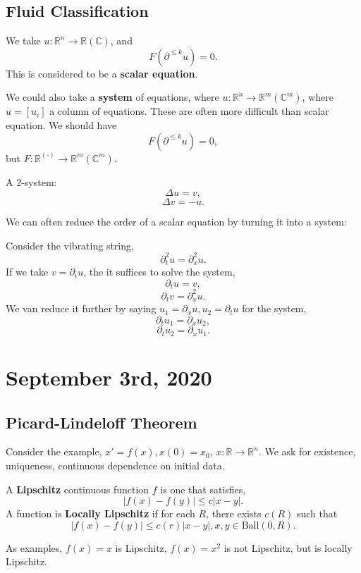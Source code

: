 \documentclass[12pt]{scrartcl}
\newcommand{\R}{\mathbb{R}}
\newcommand{\C}{\mathbb C}
\begin{document}
\subsection{Fluid Classification}
We take $u : \R^n \rightarrow \R(\C)$, and 
$$F(\partial^{\le k} u) =  0.$$
This is considered to be a \textbf{scalar equation}.

We could also take a \textbf{system} of equations, where $u: \R^n \rightarrow \R^m(\C^m)$, where $u = [u_i]$ a column of equations.  These are often more difficult than scalar equation.  We should have 
$$F(\partial^{\le k} u) = 0,$$
but $F : \R^{(\cdot)} \rightarrow \R^m(\C^m).$
\begin{example} A 2-system:
$$\Delta u = v,$$
$$\Delta v = -u.$$
\end{example}
We can often reduce the order of a scalar equation by turning it into a system:
\begin{example} Consider the vibrating string, $$\partial_t^2 u = \partial_x^2 u.$$
If we take $v = \partial_t u$, the it suffices to solve the system,
$$\partial_t u = v,$$
$$\partial_t v = \partial_x^2 u.$$
We van reduce it further by saying $u_1 = \partial_x u, u_2 = \partial_t u$ for the system,
$$\partial_t u_1 = \partial_x u_2,$$
$$\partial_t u_2 = \partial_x u_1.$$
\end{example}
\newpage
\section{September 3rd, 2020}
\subsection{Picard-Lindeloff Theorem}
Consider the example, $x' = f(x), x(0) = x_0$, $x: \R \rightarrow \R^n$.  We ask for existence, uniqueness,  continuous dependence on initial data.
\begin{definition}
A \textbf{Lipschitz} continuous function $f$ is one that satisfies, $$|f(x) - f(y)| \le c|x-y|.$$  A function is \textbf{Locally Lipschitz} if for each $R$, there exists $c(R)$ such that 
$$|f(x) - f(y)| \le c(r)|x - y|, x, y \in \text{Ball}(0, R).$$

As examples, $f(x) = x$ is Lipschitz, $f(x) = x^2$ is not Lipschitz, but is locally Lipschitz.
\end{definition}
\end{document}
